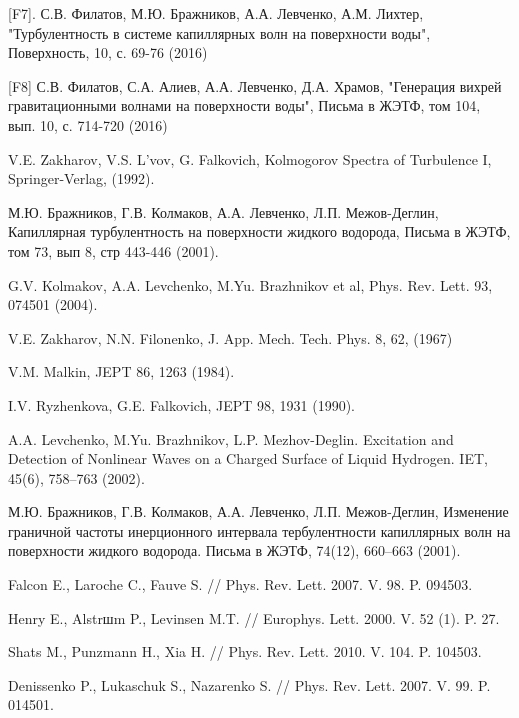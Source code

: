 [F7]. С.В. Филатов, М.Ю. Бражников, А.А. Левченко,  А.М. Лихтер, "Турбулентность в системе капиллярных волн на поверхности воды", Поверхность, 10, с. 69-76 (2016)

[F8] С.В. Филатов, С.А. Алиев, А.А. Левченко, Д.А. Храмов, "Генерация вихрей гравитационными волнами на поверхности воды", Письма в ЖЭТФ, том 104, вып.  10, с. 714-720 (2016)


\begin{thebibliography}{99}

V.E. Zakharov, V.S. L'vov, G. Falkovich, Kolmogorov Spectra of Turbulence I, Springer-Verlag, (1992).

М.Ю. Бражников, Г.В. Колмаков, А.А. Левченко, Л.П. Межов-Деглин, Капиллярная турбулентность на поверхности жидкого водорода, Письма в ЖЭТФ, том 73, вып 8, стр 443-446 (2001).
 
G.V. Kolmakov, A.A. Levchenko, M.Yu. Brazhnikov et al, Phys. Rev. Lett. 93, 074501 (2004).

V.E. Zakharov, N.N. Filonenko, J. App. Mech. Tech. Phys. 8, 62, (1967)

V.M. Malkin, JEPT 86, 1263 (1984).

I.V. Ryzhenkova, G.E. Falkovich, JEPT 98, 1931 (1990).

A.A. Levchenko, M.Yu. Brazhnikov, L.P. Mezhov-Deglin. Excitation and Detection of Nonlinear Waves on a Charged Surface of Liquid Hydrogen. IET, 45(6), 758–763 (2002).

М.Ю. Бражников, Г.В. Колмаков, А.А. Левченко, Л.П. Межов-Деглин, Изменение граничной частоты инерционного интервала тербулентности капиллярных волн на поверхности жидкого водорода. Письма в ЖЭТФ, 74(12), 660–663 (2001).

Falcon E., Laroche C., Fauve S. // Phys. Rev. Lett. 2007. V. 98. P. 094503.

Henry E., Alstrшm P., Levinsen M.T. // Europhys. Lett. 2000. V. 52 (1). P. 27.

Shats M., Punzmann H., Xia H. // Phys. Rev. Lett. 2010. V. 104. P. 104503.

Denissenko P., Lukaschuk S., Nazarenko S. // Phys. Rev. Lett. 2007. V. 99. P. 014501.


\end{thebibliography}
